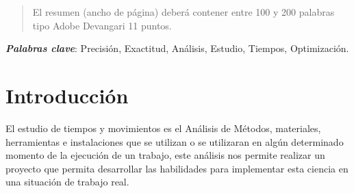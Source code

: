     
    
    
    \maketitle
    \thispagestyle{fancy}
    
    
    
    \begin{abstract}
    \noindent 
    El resumen (ancho de página) deberá contener entre 100 y 200 palabras tipo Adobe Devangari 11 puntos.
    
    \end{abstract}
    \textbf{\textit{Palabras clave}}: {Precisión, Exactitud, Análisis, Estudio, Tiempos, Optimización.}
    
    \section{Introducción}
    
    
    El estudio de tiempos y movimientos es el Análisis de Métodos, materiales, herramientas e instalaciones que se utilizan o se utilizaran en algún determinado momento de la ejecución de un trabajo, este análisis nos permite realizar un proyecto que permita desarrollar las habilidades para implementar esta ciencia en una situación de trabajo real. 
    

